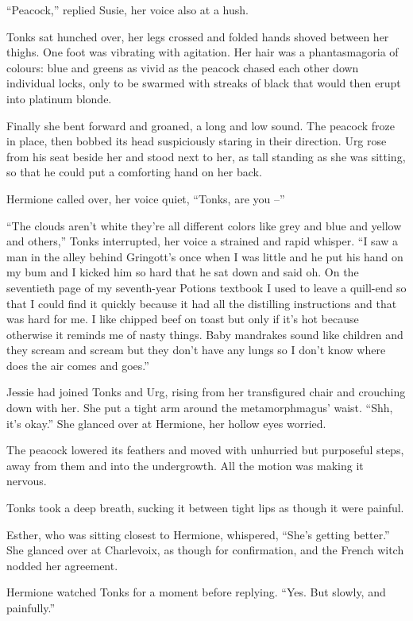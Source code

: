 ``Peacock,'' replied Susie, her voice also at a hush.

Tonks sat hunched over, her legs crossed and folded hands shoved between
her thighs. One foot was vibrating with agitation. Her hair was a
phantasmagoria of colours: blue and greens as vivid as the peacock
chased each other down individual locks, only to be swarmed with streaks
of black that would then erupt into platinum blonde.

Finally she bent forward and groaned, a long and low sound. The peacock
froze in place, then bobbed its head suspiciously staring in their
direction. Urg rose from his seat beside her and stood next to her, as
tall standing as she was sitting, so that he could put a comforting hand
on her back.

Hermione called over, her voice quiet, ``Tonks, are you --''

``The clouds aren't white they're all different colors like grey and
blue and yellow and others,'' Tonks interrupted, her voice a strained
and rapid whisper. ``I saw a man in the alley behind Gringott's once
when I was little and he put his hand on my bum and I kicked him so hard
that he sat down and said oh. On the seventieth page of my seventh-year
Potions textbook I used to leave a quill-end so that I could find it
quickly because it had all the distilling instructions and that was hard
for me. I like chipped beef on toast but only if it's hot because
otherwise it reminds me of nasty things. Baby mandrakes sound like
children and they scream and scream but they don't have any lungs so I
don't know where does the air comes and goes.''

Jessie had joined Tonks and Urg, rising from her transfigured chair and
crouching down with her. She put a tight arm around the metamorphmagus'
waist. ``Shh, it's okay.'' She glanced over at Hermione, her hollow eyes
worried.

The peacock lowered its feathers and moved with unhurried but purposeful
steps, away from them and into the undergrowth. All the motion was
making it nervous.

Tonks took a deep breath, sucking it between tight lips as though it
were painful.

Esther, who was sitting closest to Hermione, whispered, ``She's getting
better.'' She glanced over at Charlevoix, as though for confirmation,
and the French witch nodded her agreement.

Hermione watched Tonks for a moment before replying. ``Yes. But slowly,
and painfully.''

